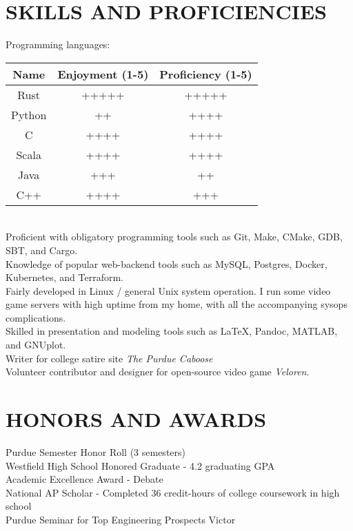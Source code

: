 \documentclass[10pt]{res}
\begin{document}
\begin{resume}
\vspace{-10pt}\section{SKILLS AND PROFICIENCIES}          
  Programming languages:\\
  \begin{tabular}{c | c | c}
    \hline
    Name & Enjoyment (1-5) & Proficiency (1-5) \\\hline
    Rust & +++++ & +++++ \\
    Python & ++ & ++++ \\
    C & ++++ & ++++ \\
    Scala & ++++ & ++++ \\
    Java & +++ & ++ \\
    C++ & ++++ & +++ \\
    \hline
  \end{tabular}\\
	Proficient with obligatory programming tools such as Git, Make, CMake, GDB, SBT, and Cargo. \\
  Knowledge of popular web-backend tools such as MySQL, Postgres, Docker, Kubernetes, and Terraform.\\
  	Fairly developed in Linux / general Unix system operation. I run some video game servers with high uptime from my home, with all the accompanying sysops complications.\\
	Skilled in presentation and modeling tools such as \LaTeX, Pandoc, MATLAB, and GNUplot. \\
	Writer for college satire site \emph{The Purdue Caboose} \\
	Volunteer contributor and designer for open-source video game \emph{Veloren}.
 
\vspace{-10pt}\section{HONORS AND AWARDS}          
  Purdue Semester Honor Roll (3 semesters) \\
	Westfield High School Honored Graduate - 4.2 graduating GPA \\
	Academic Excellence Award - Debate \\
	National AP Scholar - Completed 36 credit-hours of college coursework in high school \\
  Purdue Seminar for Top Engineering Prospects Victor \\

\end{resume}
\end{document}
